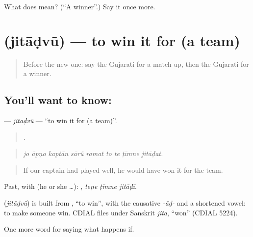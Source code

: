 \begin{tcolorbox}[breakable,colback=teal!4,colframe=teal!35!black,title={Before you move on}]
What does  mean? (\textquotedblleft{}A winner\textquotedblright{}.) Say it once more.
\end{tcolorbox}
\section[\texorpdfstring{\gu{જિતાડવું} (jitāḍvũ)}{જિતાડવું (jitāḍvũ)}]{ (jitāḍvũ) — to win it for (a team)}

\label{lesson:GU-C548-jitadvu}



\begin{quote}
Before the new one: say the Gujarati for a match-up, then the Gujarati for a winner.
\end{quote}

\subsection*{You'll want to know: }
\textbf{} — \emph{jitāḍvũ} — \textquotedblleft{}to win it for (a team)\textquotedblright{}.

\begin{quote}
        .
\end{quote}

\begin{quote}
\emph{jo āpṇo kaptān sārũ ramat to te ṭīmne jitāḍat.}
\end{quote}

\begin{quote}
If our captain had played well, he would have won it for the team.
\end{quote}

Past, with  (he or she …):   , \emph{teṇe ṭīmne jitāḍī}.

\begin{cousinweb}
\textbf{} (\emph{jitāḍvũ}) is built from \textbf{}, \textquotedblleft{}to win\textquotedblright{}, with the causative \emph{-āḍ-} and a shortened vowel: to make someone win. CDIAL files \textbf{} under Sanskrit \emph{jita}, \textquotedblleft{}won\textquotedblright{} (CDIAL 5224).
\end{cousinweb}

\begin{grammarlens}[title={What you've built}]
One more word for saying what happens if.
\end{grammarlens}

